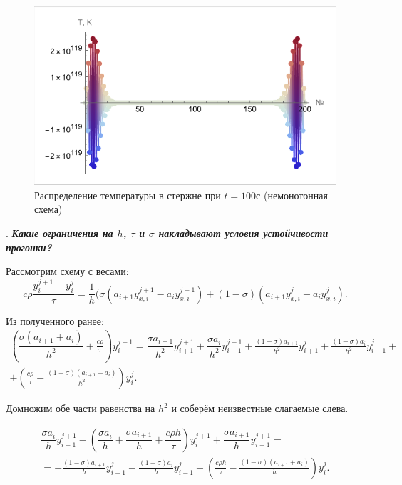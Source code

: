 \documentclass[12pt, a4paper]{article}
\newcounter{mycounter}
\newcommand{\quastion}[1]{%
	\stepcounter{mycounter}%
	\textbf{\themycounter}.  %
	\textbf{\textit{#1}}
	
}
\begin{document}
 \begin{figure}[H]
	\centering
	\includegraphics[width=1\textwidth]{nomonotExample}
	\caption{Распределение температуры в стержне при \mbox{$t=100$с} (немонотонная схема)}
\end{figure}

	\clearpage %
	\quastion{Какие ограничения на $h$, $\tau$ и $\sigma$ накладывают условия устойчивости прогонки?}
	
		Рассмотрим схему с весами:
	\[
	c \rho \frac{y^{j+1}_i - y^{j}_i}{\tau} = \frac{1}{h} (\sigma(a_{i+1} y^{j+1}_{x,i} - a_{i} y^{j+1}_{\bar{x},i}) + (1-\sigma)(a_{i+1} y^{j}_{x,i} - a_{i} y^{j}_{\bar{x},i}).
	\]
	
	Из полученного ранее:
	\begin{multline*}
		(\dfrac{\sigma(a_{i+1}+a_i)}{h^2}+\frac{c \rho}{\tau})y_i^{j+1} = \dfrac{\sigma a_{i+1}}{h^2}y_{i+1}^{j+1} + \dfrac{\sigma a_{i}}{h^2}y_{i-1}^{j+1} + \frac{(1-\sigma)a_{i+1}}{h^2}y_{i+1}^j + \frac{(1-\sigma)a_{i}}{h^2}y_{i-1}^j +\\ 
		+(\frac{c \rho}{\tau} - \frac{(1-\sigma)(a_{i+1}+a_i)}{h^2})y_i^j.
	\end{multline*}
	
	Домножим обе части равенства на $h^2$ и соберём неизвестные слагаемые слева.
	
	\begin{multline*}
	\dfrac{\sigma a_i}{h} y_{i-1}^{j+1} - (\dfrac{\sigma a_i}{h} + \dfrac{\sigma a_{i+1}}{h}+\dfrac{c \rho h}{\tau})y_i^{j+1} + \dfrac{\sigma a_{i+1}}{h} y_{i+1}^{j+1} = \\
	= - \frac{(1-\sigma)a_{i+1}}{h}y_{i+1}^j - \frac{(1-\sigma)a_{i}}{h}y_{i-1}^j -
	(\frac{c \rho h}{\tau} - \frac{(1-\sigma)(a_{i+1}+a_i)}{h})y_i^j.
\end{multline*}
	
\end{document}
